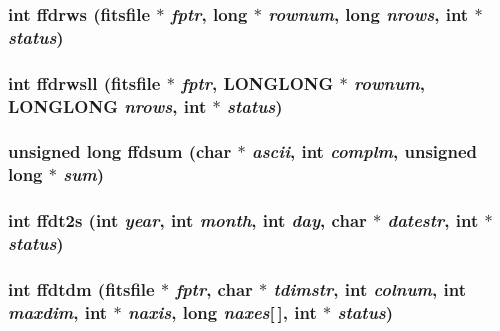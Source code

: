 \subsubsection{\setlength{\rightskip}{0pt plus 5cm}int ffdrws (\bf{fitsfile} $\ast$ {\em fptr}, long $\ast$ {\em rownum}, long {\em nrows}, int $\ast$ {\em status})}\label{fitsio_8h_450ce3d96ff7a288a6a85572eb3ea833}


\subsubsection{\setlength{\rightskip}{0pt plus 5cm}int ffdrwsll (\bf{fitsfile} $\ast$ {\em fptr}, \bf{LONGLONG} $\ast$ {\em rownum}, \bf{LONGLONG} {\em nrows}, int $\ast$ {\em status})}\label{fitsio_8h_d372e6246c6c053a226a374967abb0c2}


\subsubsection{\setlength{\rightskip}{0pt plus 5cm}unsigned long ffdsum (char $\ast$ {\em ascii}, int {\em complm}, unsigned long $\ast$ {\em sum})}\label{fitsio_8h_92ef99105023242d9d89231c60960911}


\subsubsection{\setlength{\rightskip}{0pt plus 5cm}int ffdt2s (int {\em year}, int {\em month}, int {\em day}, char $\ast$ {\em datestr}, int $\ast$ {\em status})}\label{fitsio_8h_5d40e5b1da91bf71da1d25d207af045b}


\subsubsection{\setlength{\rightskip}{0pt plus 5cm}int ffdtdm (\bf{fitsfile} $\ast$ {\em fptr}, char $\ast$ {\em tdimstr}, int {\em colnum}, int {\em maxdim}, int $\ast$ {\em naxis}, long {\em naxes}[$\,$], int $\ast$ {\em status})}\label{fitsio_8h_cdc35cf0e93c93afd457df39fba48f2f}


